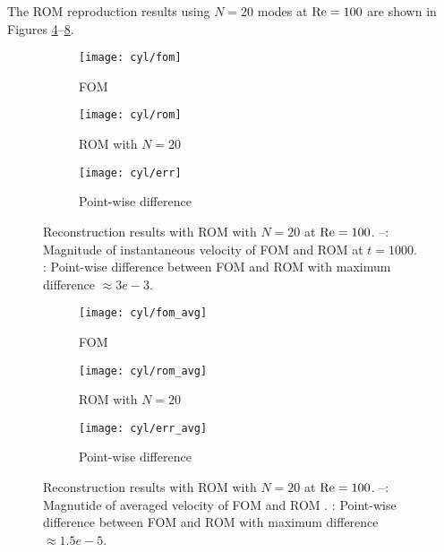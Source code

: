 The ROM reproduction results using $N=20$ modes at $\rm Re=100$ are shown in 
Figures \ref{fig:1}--\ref{fig:2}.
\begin{figure}[h]
     \centering
     \begin{subfigure}[b]{0.3\textwidth}
         \centering
         \texttt{[image: cyl/fom]}
         \caption{FOM}
         \label{fig:1_a}
     \end{subfigure}
     \hfill
     \begin{subfigure}[b]{0.3\textwidth}
         \centering
         \texttt{[image: cyl/rom]}
         \caption{ROM with $N=20$}
         \label{fig:1_b}
     \end{subfigure}
     \hfill
     \begin{subfigure}[b]{0.3\textwidth}
         \centering
         \texttt{[image: cyl/err]}
         \caption{Point-wise difference}
         \label{fig:1_c}
     \end{subfigure}
     \caption{Reconstruction results with ROM with $N=20$ at $\rm Re=100$.
--: Magnitude of instantaneous velocity of FOM
and ROM at $t=1000$. : Point-wise difference between FOM and
ROM with maximum difference $\approx 3e-3$.}
      \label{fig:1}
\end{figure}
\begin{figure}[h]
     \centering
     \begin{subfigure}[b]{0.3\textwidth}
         \centering
         \texttt{[image: cyl/fom\_avg]}
         \caption{FOM}
         \label{fig:2_a}
     \end{subfigure}
     \hfill
     \begin{subfigure}[b]{0.3\textwidth}
         \centering
         \texttt{[image: cyl/rom\_avg]}
         \caption{ROM with $N=20$}
         \label{fig:2_b}
     \end{subfigure}
     \hfill
     \begin{subfigure}[b]{0.3\textwidth}
         \centering
         \texttt{[image: cyl/err\_avg]}
         \caption{Point-wise difference}
         \label{fig:2_c}
     \end{subfigure} 
     \caption{Reconstruction results with ROM with $N=20$ at $\rm Re=100$.
     --: Magnutide of averaged velocity of FOM
and ROM .  : Point-wise difference between FOM and ROM with
maximum difference $\approx 1.5e-5$.}
     \label{fig:2}
\end{figure}

